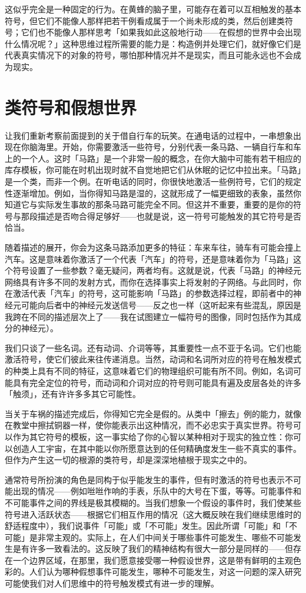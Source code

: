 \documentclass[
  12pt,
  twoside,
  openright,
  oldfontcommands,
]{memoir}
\begin{document}
这似乎完全是一种固定的行为。在黄蜂的脑子里，可能存在着可以互相触发的基本符号，但它们不能像人那样把若干例看成属于一个尚未形成的类，然后创建类符号；它们也不能像人那样思考「如果我如此这般地行动------在假想的世界中会出现什么情况呢？」这种思维过程所需要的能力是：构造例并处理它们，就好像它们是代表真实情况下的对象的符号，哪怕那种情况并不是现实，而且可能永远也不会成为现实。

\section{类符号和假想世界}

让我们重新考察前面提到的关于借自行车的玩笑。在通电话的过程中，一串想象出现在你脑海里。开始，你需要激活一些符号，分别代表一条马路、一辆自行车和车上的一个人。这时「马路」是一个非常一般的概念，在你大脑中可能有若干相应的库存模板，你可能在时机出现时就不自觉地把它们从休眠的记忆中拉出来。「马路」是一个类，而非一个例。在听电话的同时，你很快地激活一些例符号，它们的规定性逐渐增加。例如，当你得知马路是湿的，这就形成了一幅更细致的表象，虽然你知道它与实际发生事故的那条马路可能完全不同。但这并不重要，重要的是你的符号与那段描述是否吻合得足够好------也就是说，这一符号可能触发的其它符号是否恰当。

随着描述的展开，你会为这条马路添加更多的特征：车来车往，骑车有可能会撞上汽车。这是意味着你激活了一个代表「汽车」的符号，还是意味着你为「马路」这个符号设置了一些参数？毫无疑问，两者均有。这就是说，代表「马路」的神经元网络具有许多不同的发射方式，而你在选择事实上将发射的子网络。与此同时，你在激活代表「汽车」的符号，这可能影响「马路」的参数选择过程，即前者中的神经元可能向后者中的神经元发送信号------反之也一样（这听起来有些混乱，原因是我跨在不同的描述层次上了------我在试图建立一幅符号的图像，同时包括作为其成分的神经元）。

我们只谈了一些名词。还有动词、介词等等，其重要性一点不亚于名词。它们也能激活符号，使它们彼此来往传递消息。当然，动词和名词所对应的符号在触发模式的种类上具有不同的特征，这意味着它们的物理组织可能有所不同。例如，名词可能具有完全定位的符号，而动词和介词对应的符号则可能具有遍及皮层各处的许多「触须」，还有许许多多其它可能性。

当关于车祸的描述完成后，你得知它完全是假的。从类中「擦去」例的能力，就像在教堂中擦拭铜器一样，使你能表示出这种情况，而不必忠实于真实世界。符号可以作为其它符号的模板，这一事实给了你的心智以某种相对于现实的独立性：你可以创造人工宇宙，在其中能以你所愿意达到的任何精确度发生一些不真实的事件。但作为产生这一切的根源的类符号，却是深深地植根于现实之中的。

通常符号所扮演的角色是同构于似乎能发生的事件，但有时激活的符号也表示不可能出现的情况------例如咝咝作响的手表，乐队中的大号在下蛋，等等。可能事件和不可能事件之间的界线是极其模糊的。当我们想象一个假设的事件时，我们使某些符号进入活跃状态------根据它们相互作用的情况（这大概反映在我们继续思维时的舒适程度中），我们说事件「可能」或「不可能」发生。因此所谓「可能」和「不可能」是非常主观的。实际上，在人们中间关于哪些事件可能发生、哪些不可能发生是有许多一致看法的。这反映了我们的精神结构有很大一部分是同样的------但存在一个边界区域，在那里，我们愿意接受哪一种假设世界，这是带有鲜明的主观色彩的。人们认为哪种假想事件可能发生，哪种不可能发生，对这一问题的深入研究可能使我们对人们思维中的符号触发模式有进一步的理解。
\end{document}
